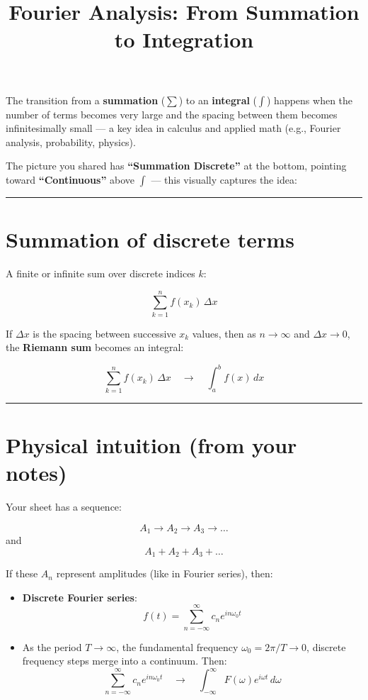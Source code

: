 \documentclass[UTF8,a4paper,11pt]{ctexart}
\title{Fourier Analysis: From Summation to Integration}
\author{}
\date{}
\begin{document}
\maketitle

The transition from a \textbf{summation} ($\sum$) to an \textbf{integral} ($\int$) happens when the number of terms becomes very large and the spacing between them becomes infinitesimally small --- a key idea in calculus and applied math (e.g., Fourier analysis, probability, physics).

The picture you shared has \textbf{``Summation Discrete''} at the bottom, pointing toward \textbf{``Continuous''} above $\int$ --- this visually captures the idea:

\bigskip\noindent\rule{\linewidth}{0.4pt}\bigskip

\section{Summation of discrete terms}

A finite or infinite sum over discrete indices $k$:

\[
\sum_{k=1}^{n} f(x_k) \, \Delta x
\]

If $\Delta x$ is the spacing between successive $x_k$ values,
then as $n \to \infty$ and $\Delta x \to 0$,
the \textbf{Riemann sum} becomes an integral:

\[
\sum_{k=1}^{n} f(x_k) \, \Delta x \quad \longrightarrow \quad \int_{a}^{b} f(x) \, dx
\]

\bigskip\noindent\rule{\linewidth}{0.4pt}\bigskip

\section{Physical intuition (from your notes)}

Your sheet has a sequence:

\[
A_1 \to A_2 \to A_3 \to \dots
\]
and
\[
A_1 + A_2 + A_3 + \dots
\]

If these $A_n$ represent amplitudes (like in Fourier series), then:

\begin{itemize}
  \item \textbf{Discrete Fourier series}:
  \[
  f(t) = \sum_{n=-\infty}^{\infty} c_n e^{in\omega_0 t}
  \]

  \item As the period $T \to \infty$, the fundamental frequency $\omega_0 = 2\pi/T \to 0$,
  discrete frequency steps merge into a continuum.
  Then:
  \[
  \sum_{n=-\infty}^{\infty} c_n e^{in\omega_0 t} \quad \longrightarrow \quad \int_{-\infty}^{\infty} F(\omega) e^{i\omega t} \, d\omega
  \]
\end{itemize}
\end{document}
